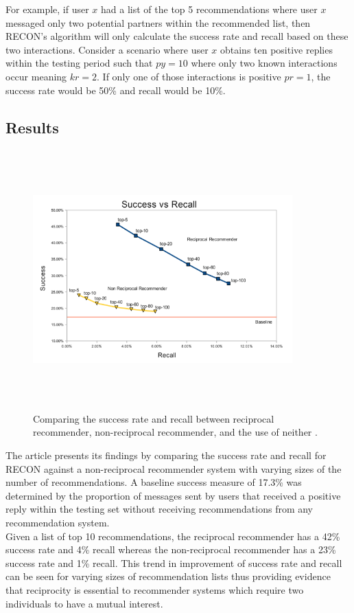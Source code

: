 \documentclass[11pt]{article}
\begin{document}
For example, if user $x$ had a list of the top 5 recommendations where user $x$ messaged only two potential partners within the recommended list, then RECON's algorithm will only calculate the success rate and recall based on these two interactions. Consider a scenario where user $x$ obtains ten positive replies within the testing period such that $py=10$ where only two known interactions occur meaning $kr=2$. If only one of those interactions is positive $pr=1$, the success rate would be 50\% and recall would be 10\%.

\subsection{Results}

\begin{figure}[h]
\begin{center}
\includegraphics[width=10cm,height=10cm,keepaspectratio]{Recon_Results.png} 
\caption{Comparing the success rate and recall between reciprocal recommender, non-reciprocal recommender, and the use of neither \cite{RECON}.}    
\end{center}
\end{figure}

The article presents its findings by comparing the success rate and recall for RECON against a non-reciprocal recommender system with varying sizes of the number of recommendations. A baseline success measure of 17.3\% was determined by the proportion of messages sent by users that received a positive reply within the testing set \cite{RECON} without receiving recommendations from any recommendation system.\\
\indent Given a list of top 10 recommendations, the reciprocal recommender has a 42\% success rate and 4\% recall whereas the non-reciprocal recommender has a 23\% success rate and 1\% recall. This trend in improvement of success rate and recall can be seen for varying sizes of recommendation lists thus providing evidence that reciprocity is essential to recommender systems which require two individuals to have a mutual interest.
\end{document}
